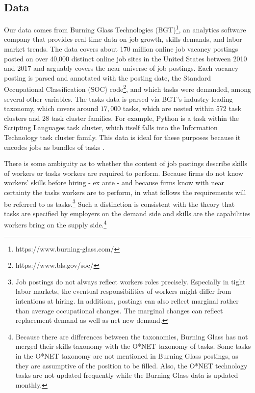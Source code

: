 \documentclass[letterpaper]{article} %
\begin{document}
\subsection{Data}
\label{subsec:data} Our data comes from Burning Glass Technologies (BGT)\footnote{https://www.burning-glass.com/}, an analytics software company that provides real-time data on job growth, skills demands, and labor market trends. The data covers about 170 million online job vacancy postings posted on over 40,000 distinct online job sites in the United States between 2010 and 2017 and arguably covers the near-universe of job postings. Each vacancy posting is parsed and annotated with the posting date, the Standard Occupational Classification (SOC) code\footnote{https://www.bls.gov/soc/}, and which tasks were demanded, among several other variables. The tasks data is parsed via BGT's industry-leading taxonomy, which covers around $17,000$ tasks, which are nested within 572 task clusters and 28 task cluster families. For example, Python is a task within the Scripting Languages task cluster, which itself falls into the Information Technology task cluster family. This data is ideal for these purposes because it encodes jobs as bundles of tasks \cite{Deming2018}.

There is some ambiguity as to whether the content of job postings describe skills of workers or tasks workers are required to perform. Because firms do not know workers' skills before hiring - ex ante - and because firms know with near certainty the tasks workers are to perform, in what follows the requirements will be referred to as tasks.\footnote{Job postings do not always reflect workers roles precisely. Especially in tight labor markets, the eventual responsibilities of workers might differ from intentions at hiring. In additions, postings can also reflect marginal rather than average occupational changes. The marginal changes can reflect replacement demand as well as net new demand.} Such a distinction is consistent with the theory that tasks are specified by employers on the demand side and skills are the capabilities workers bring on the supply side.\footnote{Because there are differences between the taxonomies, Burning Glass has not merged their skills taxonomy with the O*NET taxonomy of tasks. Some tasks in the O*NET taxonomy are not mentioned in Burning Glass postings, as they are assumptive of the position to be filled. Also, the O*NET technology tasks are not updated frequently while the Burning Glass data is updated monthly.}
\end{document}
